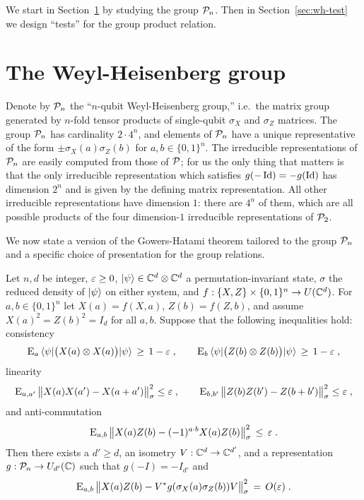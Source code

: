 We start in Section~\ref{sec:wh} by studying the group $\mathcal{P}_n$. Then in Section~\ref{sec:wh-test} we design ``tests'' for the group product relation. 

\section{The Weyl-Heisenberg group}
\label{sec:wh}

Denote by $\mathcal{P}_n$ the ``$n$-qubit Weyl-Heisenberg group,'' i.e.\ the matrix group generated by $n$-fold tensor products of single-qubit $\sigma_X$ and $\sigma_Z$ matrices. The group $\mathcal{P}_n$ has cardinality $2\cdot 4^n$, and elements of $\mathcal{P}_n$ have a unique representative of the form $\pm \sigma_X(a)\sigma_Z(b)$ for $a,b\in\{0,1\}^n$. 
 The irreducible representations of  $\mathcal{P}_n$ are easily computed from those of $\mathcal{P}$; for us the only thing that matters is that the only irreducible representation which satisfies $g(-\mathop{\rm Id}\nolimits)=-g(\mathop{\rm Id}\nolimits)$ has dimension $2^n$ and is given by the defining matrix representation. All other irreducible representations have dimension $1$: there are $4^n$ of them, which are all possible products of the four dimension-$1$ irreducible representations of $\mathcal{P}_2$.

We now state a version of the Gowers-Hatami theorem tailored to the group $\mathcal{P}_n$ and a specific choice of presentation for the group relations. 

\begin{corollary}\label{cor:gh}
Let $n,d$ be integer, $\varepsilon \geq 0$, $|\psi\rangle \in \mathbb{C}^d \otimes \mathbb{C}^d$ a permutation-invariant state, $\sigma$ the reduced density of $|\psi\rangle$ on either system,  and $f: \{X,Z\}\times \{0,1\}^n \to U(\mathbb{C}^d)$. For $a,b\in\{0,1\}^n$ let $X(a)=f(X,a)$, $Z(b)=f(Z,b)$, and assume $X(a)^2=Z(b)^2=I_d$ for all $a,b$. Suppose that the following inequalities hold: consistency
\begin{equation}\label{eq:gh-cons}
 \textsc{E}_{a} \, \langle\psi| \big(X(a) \otimes X(a)\big) |\psi\rangle \,\geq\,1-\varepsilon\;,\qquad \textsc{E}_{b} \,\langle\psi| \big(Z(b) \otimes Z(b) \big)|\psi\rangle\,\geq\,1-\varepsilon\;,
\end{equation}
linearity
\begin{equation}\label{eq:gh-commute}
 \textsc{E}_{a,a'} \,\big\|X(a)X(a')-X(a+a')\big\|_\sigma^2 \leq \varepsilon\;,\qquad\textsc{E}_{b,b'}\, \big\|Z(b)Z(b')-Z(b+b')\big\|_\sigma^2 \leq \varepsilon\;,
\end{equation}
and anti-commutation
\begin{equation}\label{eq:gh-ac}
 \textsc{E}_{a,b} \,\big\| X(a)Z(b)-(-1)^{a\cdot b} X(a)Z(b)\big\|_\sigma^2\,\leq\,\varepsilon\;.
\end{equation}
Then there exists a $d'\geq d$, an isometry $V:\mathbb{C}^d\to \mathbb{C}^{d'}$, and a representation $g:\mathcal{P}_n\to U_{d'}(\mathbb{C})$ such that $g(-I)=-I_{d'}$ and
$$\textsc{E}_{a,b}\, \big\| X(a)Z(b) - V^*g(\sigma_X(a)\sigma_Z(b))V \big\|_\sigma^2 \,=\, O(\varepsilon)\;.$$
\end{corollary}

